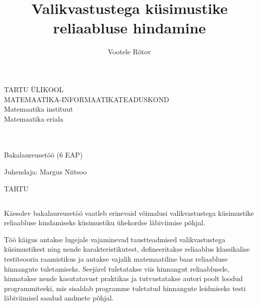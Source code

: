 \documentclass[a4paper,12pt,oneside]{article}
\author{Vootele Rõtov}
\title{Valikvastustega küsimustike reliaabluse hindamine}
\newcommand{\nocontentsline}[3]{}
\newcommand{\tocless}[2]{\bgroup\let\addcontentsline=\nocontentsline#1{#2}\egroup}
\numberwithin{equation}{section}
\theoremstyle{definition}
\begin{document}
\makeatletter
\begin{titlepage}
\begin{center}

{\large TARTU ÜLIKOOL}\\[0.3cm]
{\large MATEMAATIKA-INFORMAATIKATEADUSKOND}\\[0.3cm]
{\large Matemaatika instituut}\\[0.3cm]
{\large Matemaatika eriala} %

\vfill
{\large \@author}\\[0.3cm]
{\huge \textbf{\@title}}\\[0.3cm]
{\large Bakalaureusetöö (6 EAP)} %

\vfill

\begin{flushright}
{\large Juhendaja: Margus Niitsoo}
\end{flushright}
 

\vfill

{\large TARTU \the\year}

\end{center}
\end{titlepage}
\makeatother

\pagebreak

\makeatletter
\tocless{\subsection*{\@title}}

\tocless{\subsubsection*{\@author}}

\tocless{\subsubsection*{Lühikokkuvõte}}

\makeatother

Käesolev bakalaureusetöö vaatleb erinevaid võimalusi valikvastustega küsimustike reliaabluse hindamiseks küsimustiku ühekordse läbiviimise põhjal. 

Töö käigus antakse lugejale vajaminevad taustteadmised valikvastustega küsimustikest ning nende karakteristikutest, defineeritakse reliaablus klassikalise testiteooria raamistikus ja antakse vajalik matemaatiline baas reliaabluse hinnangute tuletamiseks. Seejärel tuletatakse viis hinnangut reliaablusele, hinnatakse nende kasutatavust praktikas ja tutvustatakse autori poolt loodud programmiteeki, mis sisaldab programme tuletatud hinnangute leidmiseks testi läbiviimisel saadud andmete põhjal.
\end{document}

